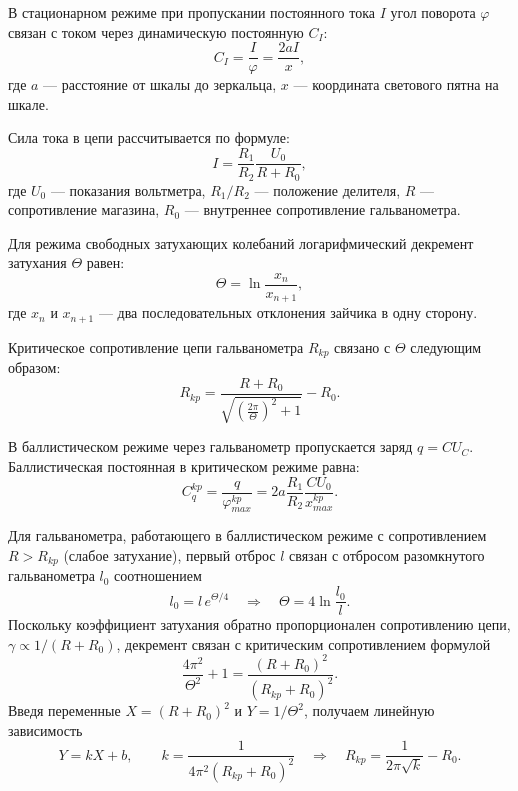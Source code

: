 \documentclass[a4paper,12pt]{article}
\begin{document}
В стационарном режиме при пропускании постоянного тока $I$ угол поворота $\varphi$ связан с током через динамическую постоянную $C_I$:
\begin{equation}
    \label{eq:ci_def}
    C_I = \frac{I}{\varphi} = \frac{2aI}{x},
\end{equation}
где $a$ --- расстояние от шкалы до зеркальца, $x$ --- координата светового пятна на шкале. 

Сила тока в цепи рассчитывается по формуле:
\begin{equation}
    \label{eq:current}
    I = \frac{R_1}{R_2}\frac{U_0}{R+R_0},
\end{equation}
где $U_0$ --- показания вольтметра, $R_1/R_2$ --- положение делителя, $R$ --- сопротивление магазина, $R_0$ --- внутреннее сопротивление гальванометра.

Для режима свободных затухающих колебаний логарифмический декремент затухания $\Theta$ равен:
\begin{equation}
    \label{eq:decrement}
    \Theta = \ln\frac{x_n}{x_{n+1}},
\end{equation}
где $x_n$ и $x_{n+1}$ --- два последовательных отклонения зайчика в одну сторону.

Критическое сопротивление цепи гальванометра $R_{kp}$ связано с $\Theta$ следующим образом:
\begin{equation}
    \label{eq:rkp_formula}
    R_{kp} = \frac{R+R_0}{\sqrt{\left(\frac{2\pi}{\Theta}\right)^2+1}} - R_0.
\end{equation}

В баллистическом режиме через гальванометр пропускается заряд $q = C U_C$. Баллистическая постоянная в критическом режиме равна:
\begin{equation}
    \label{eq:cq}
    C_q^{kp} = \frac{q}{\varphi_{max}^{kp}} = 2a\frac{R_1}{R_2}\frac{C U_0}{x_{max}^{kp}}.
\end{equation}

Для гальванометра, работающего в баллистическом режиме с сопротивлением $R > R_{kp}$ (слабое затухание), первый отброс $l$ связан с отбросом разомкнутого гальванометра $l_0$ соотношением
\begin{equation}
    \label{eq:l0_l}
    l_0 = l\, e^{\Theta/4}
    \quad\Rightarrow\quad
    \Theta = 4\ln\frac{l_0}{l}.
\end{equation}
Поскольку коэффициент затухания обратно пропорционален сопротивлению цепи, $\gamma \propto 1/(R+R_0)$, декремент связан с критическим сопротивлением формулой
\begin{equation}
    \label{eq:lin_theory}
    \frac{4\pi^2}{\Theta^2} + 1 = \frac{(R+R_0)^2}{(R_{kp}+R_0)^2}.
\end{equation}
Введя переменные $X = (R+R_0)^2$ и $Y = 1/\Theta^2$, получаем линейную зависимость
\begin{equation}
    \label{eq:lin}
    Y = kX + b,\qquad k = \frac{1}{4\pi^2 (R_{kp}+R_0)^2}
    \quad\Rightarrow\quad
    R_{kp} = \frac{1}{2\pi\sqrt{k}} - R_0.
\end{equation}
\end{document}
